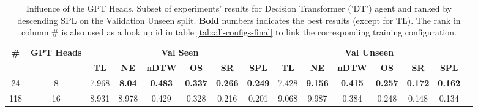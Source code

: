 \begin{table}
\centering
\caption{\label{tab:dt_heads}Influence of the GPT Heads. Subset of experiments' results for Decision Transformer ('DT') agent and ranked by descending SPL on the Validation Unseen split. \textbf{Bold} numbers indicates the best results (except for TL). The rank in column \# is also used as a look up id in table \ref{tab:all-configs-final} to link the corresponding training configuration.}
\begin{tabular}{@{\hskip3pt}c@{\hskip3pt}c@{\hskip3pt}c@{\hskip3pt}c@{\hskip3pt}c@{\hskip3pt}c@{\hskip3pt}c@{\hskip3pt}c@{\hskip3pt}c@{\hskip3pt}c@{\hskip3pt}c@{\hskip3pt}c@{\hskip3pt}c@{\hskip3pt}c@{\hskip3pt}c}
\toprule
                                  \textbf{\#} & \textbf{GPT Heads} & \multicolumn{6}{c}{\textbf{Val Seen}} & \multicolumn{6}{c}{\textbf{Val Unseen}} \\
\cmidrule(l){3-8}\cmidrule(l){9-14}\textbf{~} &         \textbf{~} &       \textbf{TL} &    \textbf{NE} &   \textbf{nDTW} &     \textbf{OS} &     \textbf{SR} &    \textbf{SPL} &         \textbf{TL} &     \textbf{NE} &   \textbf{nDTW} &     \textbf{OS} &     \textbf{SR} &    \textbf{SPL} \\
\midrule
                                           24 &                  8 &             7.968 &  \textbf{8.04} &  \textbf{0.483} &  \textbf{0.337} &  \textbf{0.266} &  \textbf{0.249} &               7.428 &  \textbf{9.156} &  \textbf{0.415} &  \textbf{0.257} &  \textbf{0.172} &  \textbf{0.162} \\
                                          118 &                 16 &             8.931 &          8.978 &           0.429 &           0.328 &           0.216 &           0.201 &               9.068 &           9.987 &           0.384 &           0.248 &           0.148 &           0.134 \\
\bottomrule
\end{tabular}
\end{table}
